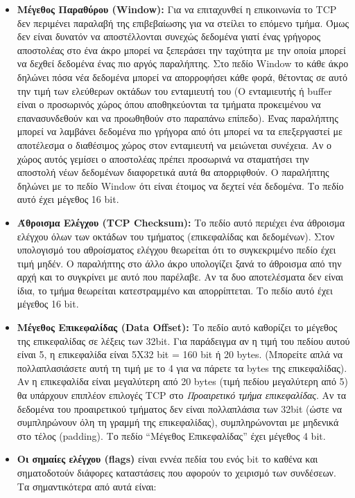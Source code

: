 \begin{itemize}
\item \textbf{Μέγεθος Παραθύρου (Window):} Για να επιταχυνθεί η επικοινωνία το TCP δεν περιμένει παραλαβή της επιβεβαίωσης για να στείλει το επόμενο τμήμα. Όμως δεν είναι δυνατόν να αποστέλλονται συνεχώς δεδομένα γιατί ένας γρήγορος αποστολέας στο ένα άκρο μπορεί να ξεπεράσει την ταχύτητα με την οποία μπορεί να δεχθεί δεδομένα ένας πιο αργός παραλήπτης. Στο πεδίο Window το κάθε άκρο δηλώνει πόσα νέα δεδομένα μπορεί να απορροφήσει κάθε φορά, θέτοντας σε αυτό την τιμή των ελεύθερων οκτάδων του ενταμιευτή του (Ο ενταμιευτής ή buffer είναι ο προσωρινός χώρος όπου αποθηκεύονται τα τμήματα προκειμένου να επανασυνδεθούν και να προωθηθούν στο παραπάνω επίπεδο). Ένας παραλήπτης μπορεί να λαμβάνει δεδομένα πιο γρήγορα από ότι μπορεί να τα επεξεργαστεί με αποτέλεσμα ο διαθέσιμος χώρος στον ενταμιευτή να μειώνεται συνέχεια. Αν ο χώρος αυτός γεμίσει ο αποστολέας πρέπει προσωρινά να σταματήσει την αποστολή νέων δεδομένων διαφορετικά αυτά θα απορριφθούν. Ο παραλήπτης δηλώνει με το πεδίο Window ότι είναι έτοιμος να δεχτεί νέα δεδομένα. Το πεδίο αυτό έχει μέγεθος 16 bit.
\item \textbf{Άθροισμα Ελέγχου (TCP Checksum):} Το πεδίο αυτό περιέχει ένα άθροισμα ελέγχου όλων των οκτάδων του τμήματος (επικεφαλίδας και δεδομένων). Στον υπολογισμό του αθροίσματος ελέγχου θεωρείται ότι το συγκεκριμένο πεδίο έχει τιμή μηδέν. Ο παραλήπτης στο άλλο άκρο υπολογίζει ξανά το άθροισμα από την αρχή και το συγκρίνει με αυτό που παρέλαβε. Αν τα δυο αποτελέσματα δεν είναι ίδια, το τμήμα θεωρείται κατεστραμμένο και απορρίπτεται. Το πεδίο αυτό έχει μέγεθος 16 bit.
\item \textbf{Μέγεθος Επικεφαλίδας (Data Offset):} Το πεδίο αυτό καθορίζει το μέγεθος της επικεφαλίδας σε λέξεις των 32bit. Για παράδειγμα αν η τιμή του πεδίου αυτού είναι 5, η επικεφαλίδα είναι 5Χ32 bit = 160 bit ή 20 bytes. (Μπορείτε απλά να πολλαπλασιάσετε αυτή τη τιμή με το 4 για να πάρετε τα bytes της επικεφαλίδας). Αν η επικεφαλίδα είναι μεγαλύτερη από 20 bytes (τιμή πεδίου μεγαλύτερη από 5) θα υπάρχουν επιπλέον επιλογές TCP στο \emph{Προαιρετικό τμήμα επικεφαλίδας}. Αν τα δεδομένα του προαιρετικού τμήματος δεν είναι πολλαπλάσια των 32bit (ώστε να συμπληρώνουν όλη τη γραμμή της επικεφαλίδας), συμπληρώνονται με μηδενικά στο τέλος (padding). Το πεδίο ``Μέγεθος Επικεφαλίδας'' έχει μέγεθος 4 bit.
\item \textbf{Οι σημαίες ελέγχου (flags)} είναι εννέα πεδία του ενός bit το καθένα και σηματοδοτούν διάφορες καταστάσεις που αφορούν το χειρισμό των συνδέσεων.  Τα σημαντικότερα από αυτά είναι:

\end{itemize}

